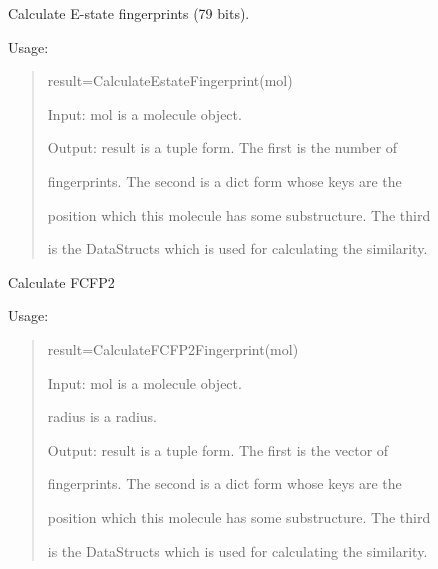 \documentclass[letterpaper,10pt,english]{sphinxmanual}
\begin{document}
\begin{fulllineitems}
\label{reference/fingerprint:fingerprint.CalculateEstateFingerprint}
Calculate E-state fingerprints (79 bits).

Usage:
\begin{quote}

result=CalculateEstateFingerprint(mol)

Input: mol is a molecule object.

Output: result is a tuple form. The first is the number of

fingerprints. The second is a dict form whose keys are the

position which this molecule has some substructure. The third

is the DataStructs which is used for calculating the similarity.
\end{quote}

\end{fulllineitems}


\begin{fulllineitems}
\label{reference/fingerprint:fingerprint.CalculateFCFP2Fingerprint}
Calculate FCFP2

Usage:
\begin{quote}

result=CalculateFCFP2Fingerprint(mol)

Input: mol is a molecule object.

radius is a radius.

Output: result is a tuple form. The first is the vector of

fingerprints. The second is a dict form whose keys are the

position which this molecule has some substructure. The third

is the DataStructs which is used for calculating the similarity.
\end{quote}

\end{fulllineitems}

\end{document}

